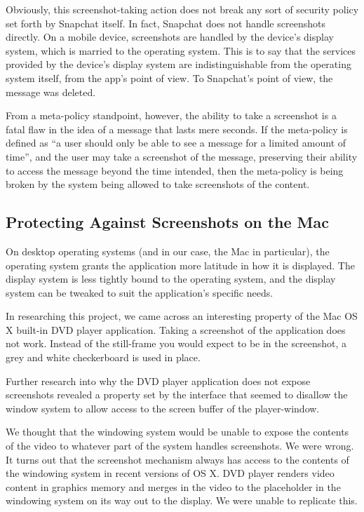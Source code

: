 \documentclass[11pt, a4paper,titlepage]{report}
\begin{document}
Obviously, this screenshot-taking action does not break any sort of security policy set forth by Snapchat itself. In fact, Snapchat does not handle screenshots directly. On a mobile device, screenshots are handled by the device's display system, which is married to the operating system. This is to say that the services provided by the device's display system are indistinguishable from the operating system itself, from the app's point of view. To Snapchat's point of view, the message was deleted.

From a meta-policy standpoint, however, the ability to take a screenshot is a fatal flaw in the idea of a message that lasts mere seconds. If the meta-policy is defined as ``a user should only be able to see a message for a limited amount of time'', and the user may take a screenshot of the message, preserving their ability to access the message beyond the time intended, then the meta-policy is being broken by the system being allowed to take screenshots of the content.

\subsection*{Protecting Against Screenshots on the Mac}
On desktop operating systems (and in our case, the Mac in particular), the operating system grants the application more latitude in how it is displayed. The display system is less tightly bound to the operating system, and the display system can be tweaked to suit the application's specific needs.

In researching this project, we came across an interesting property of the Mac OS X built-in DVD player application. Taking a screenshot of the application does not work. Instead of the still-frame you would expect to be in the screenshot, a grey and white checkerboard %
is used in place. 

Further research into why the DVD player application does not expose screenshots revealed a property set by the interface that seemed to disallow the window system to allow access to the screen buffer of the player-window. %

We thought that the windowing system would be unable to expose the contents of the video to whatever part of the system handles screenshots. We were wrong. It turns out that the screenshot mechanism always has access to the contents of the windowing system in recent versions of OS X. DVD player renders video content in graphics memory and merges in the video to the placeholder in the windowing system on its way out to the display. We were unable to replicate this.
\end{document}
